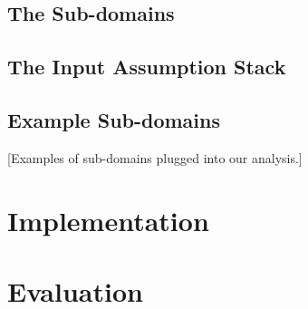 \documentclass[]{article}
\begin{document}
\subsection{The Sub-domains} \label{sub-domains}

\subsection{The Input Assumption Stack} \label{stack}

\subsection{Example Sub-domains} \label{example-domains}

[Examples of sub-domains plugged into our analysis.]

\section{Implementation}

\section{Evaluation}



\end{document}
